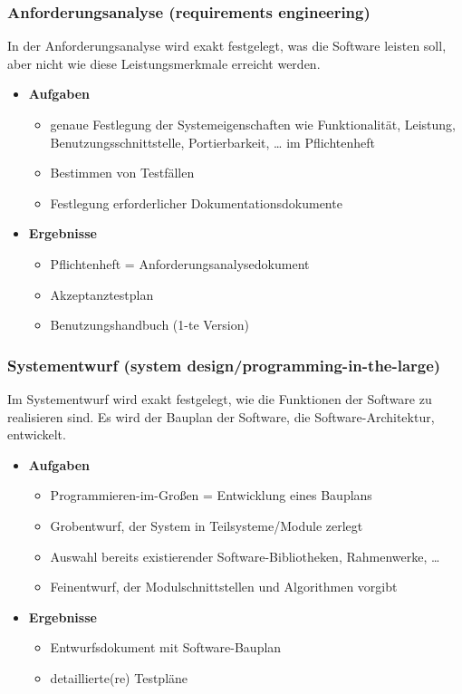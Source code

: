 	\subsubsection{Anforderungsanalyse (requirements engineering)}
	In der Anforderungsanalyse wird exakt festgelegt, was die Software leisten soll, aber nicht wie diese Leistungsmerkmale erreicht werden.
	\begin{itemize}
		\item \textbf{Aufgaben}
		\begin{itemize}
			\item genaue Festlegung der Systemeigenschaften wie Funktionalität, Leistung, Benutzungsschnittstelle, Portierbarkeit, … im Pflichtenheft
			\item Bestimmen von Testfällen
			\item Festlegung erforderlicher Dokumentationsdokumente
		\end{itemize}
		\item \textbf{Ergebnisse}
		\begin{itemize}
			\item Pflichtenheft = Anforderungsanalysedokument 
			\item Akzeptanztestplan
			\item Benutzungshandbuch (1-te Version)
		\end{itemize}
	\end{itemize}
	\subsubsection{Systementwurf (system design/programming-in-the-large)}
	Im Systementwurf wird exakt festgelegt, wie die Funktionen der Software zu realisieren sind. Es wird der Bauplan der Software, die Software-Architektur, entwickelt.
	\begin{itemize}
		\item \textbf{Aufgaben}
		\begin{itemize}
			\item Programmieren-im-Großen = Entwicklung eines Bauplans
			\item Grobentwurf, der System in Teilsysteme/Module zerlegt
			\item Auswahl bereits existierender Software-Bibliotheken, Rahmenwerke, …
			\item Feinentwurf, der Modulschnittstellen und Algorithmen vorgibt
		\end{itemize}
		\item \textbf{Ergebnisse}
		\begin{itemize}
			\item Entwurfsdokument mit Software-Bauplan
			\item detaillierte(re) Testpläne
		\end{itemize}
	\end{itemize}
